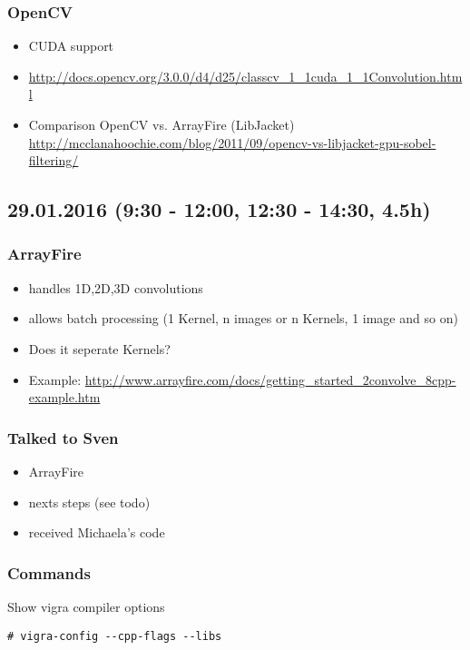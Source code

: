 \documentclass[12pt,a4paper]{article}
\begin{document}
  \subsubsection{OpenCV}
    \begin{itemize}
      \item CUDA support
      \item \url{http://docs.opencv.org/3.0.0/d4/d25/classcv_1_1cuda_1_1Convolution.html}
      \item Comparison OpenCV vs. ArrayFire (LibJacket) \url{http://mcclanahoochie.com/blog/2011/09/opencv-vs-libjacket-gpu-sobel-filtering/}
    \end{itemize}


\subsection{29.01.2016 (9:30 - 12:00, 12:30 - 14:30, 4.5h)}

  \subsubsection{ArrayFire}
    \begin{itemize}
      \item handles 1D,2D,3D convolutions
      \item allows batch processing (1 Kernel, n images or n Kernels, 1 image and so on)
      \item Does it seperate Kernels?
      \item Example: \url{http://www.arrayfire.com/docs/getting_started_2convolve_8cpp-example.htm}
    \end{itemize}

  \subsubsection{Talked to Sven}
    \begin{itemize}
      \item ArrayFire
      \item nexts steps (see todo)
      \item received Michaela's code
    \end{itemize}

  \subsubsection{Commands}

    Show vigra compiler options
    \begin{lstlisting}[style=BashInputStyle]
# vigra-config --cpp-flags --libs 
    \end{lstlisting}
\end{document}
